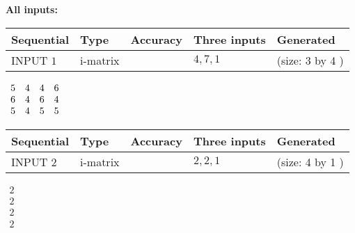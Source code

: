\documentclass[12pt]{article}
\begin{document}
   
\noindent\vspace{0.1in}\hspace{-0.08in} {\textbf{\Large{All inputs: }}}
   
   
  
  
\noindent\begin{tabular}{|l|l|l|l|l|}
\hline
 Sequential & Type & Accuracy & Three inputs & Generated \\ 
\hline
 
 
  INPUT $            1 $ & i-matrix &  & $
 4
 , 
 7
 , 
 1
 $ & (size:            3  by            4 )
 \\  \hline  
 \end{tabular}
   
   
 $\begin{array}{
 c
 c
 c
 c
 }
           5  & 
           4  & 
           4  & 
           6  \\ 
           6  & 
           4  & 
           6  & 
           4  \\ 
           5  & 
           4  & 
           5  & 
           5
\end{array}  $ 
  
  
\noindent\begin{tabular}{|l|l|l|l|l|}
\hline
 Sequential & Type & Accuracy & Three inputs & Generated \\ 
\hline
 
 
  INPUT $            2 $ & i-matrix &  & $
 2
 , 
 2
 , 
 1
 $ & (size:            4  by            1 )
 \\  \hline  
 \end{tabular}
   
   
 $\begin{array}{
 c
 }
           2  \\ 
           2  \\ 
           2  \\ 
           2
\end{array}  $ 
  
\end{document}
